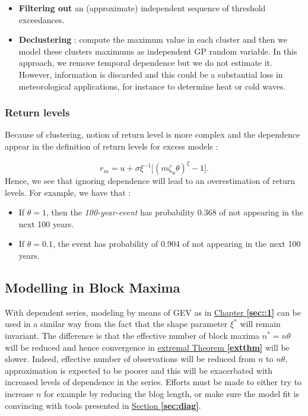 \begin{itemize}
	\item \textbf{Filtering out} an (approximate) independent sequence of threshold exceedances.
	\item \textbf{Declustering} : compute the maximum value in each cluster and then we model these clusters maximums as independent GP random variable. In this approach, we remove temporal dependence but we do not estimate it.
	However, information is discarded and this could be a substantial loss in meteorological applications, for instance to determine heat or cold waves.
\end{itemize}



\subsubsection*{Return levels}

Because of clustering, notion of return level is more complex and the dependence appear in the definition of return levels for excess models :

\begin{equation}\label{eq:rlstatio}
r_m = u + \sigma\xi^{-1}\Big[(m\zeta_u\theta)^{\xi}-1\Big].
\end{equation}
Hence, we see that ignoring dependence will lead to an overestimation of return levels. For example, we have that :

\begin{itemize}
	\item If $\theta=1$, then the \textit{100-year-event} has probability 0.368 of not appearing in the next 100 years.
	\item If $\theta=0.1$, the event has probability of 0.904 of not appearing in the next 100 years.
\end{itemize}


\subsection{Modelling in Block Maxima}

With dependent series, modeling by means of GEV as in 
\hyperref[sec::1]{Chapter \textbf{\ref{sec::1}}} can be used in 
a similar way from the fact that the shape parameter $\xi^*$ will remain invariant. The difference is that the effective number of block maxima $n^*=n\theta$ will be reduced and hence convergence in \hyperref[extthm]{extremal Theorem \textbf{\ref{extthm}}} will be slower. 
Indeed, effective number of observations will be reduced from $n$ to $n\theta$, approximation is expected to be poorer and this will be exacerbated with increased levels of dependence in the series.
Efforts must be made to either try to increase $n$ for example by reducing the blog length, or make sure the model fit is convincing with tools presented in \hyperref[sec:diag]{Section \textbf{\ref{sec:diag}}}.


